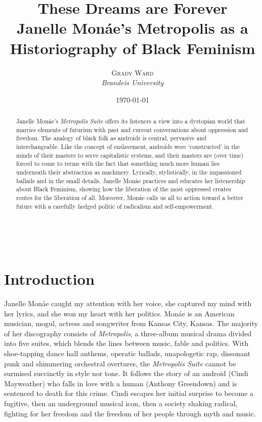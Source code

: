 \documentclass[a4paper, 11pt]{article} %
\title{\linespread{2.1}\textbf{These Dreams are Forever}\\ %
Janelle Mon\'ae's Metropolis as a Historiography of Black Feminism} %
\author{\textsc{Grady Ward} %
\\{\textit{Brandeis University}}} %
\date{\today} %
\makeatletter
\renewcommand{\maketitle}{ %
\begin{flushright} %
	{\LARGE\@title} %

	\vspace{40pt} %

	{\large\@author} %
	\\\@date %

	\vspace{30pt} %
\end{flushright}
}
\makeatother
\begin{document}
\maketitle %


\begin{abstract}

Janelle Mon\'ae's \emph{Metropolis Suite} offers its listeners a view into a dystopian world that marries elements of futurism with past and current conversations about oppression and freedom.
The analogy of black folk as androids is central, pervasive and interchangeable. 
Like the concept of enslavement, androids were `constructed' in the minds of their masters to serve capitalistic systems, and their masters are (over time) forced to come to terms with the fact that something much more human lies underneath their abstraction as machinery. 
Lyrically, stylistically, in the impassioned ballads and in the small details, Janelle Mon\'ae practices and educates her listenership about Black Feminism, showing how the liberation of the most oppressed creates routes for the liberation of all.
Moreover, Mon\'ae calls us all to action toward a better future with a carefully hedged politic of radicalism and self-empowerment.

\end{abstract}

\vspace{30pt}


\section*{Introduction}

Janelle Mon\'ae caught my attention with her voice, she captured my mind with her lyrics, and she won my heart with her politics.
Mon\'ae is an American musician, mogul, actress and songwriter from Kansas City, Kansas.
The majority of her discography consists of \emph{Metropolis}, a three-album musical drama divided into five suites, which blends the lines between music, fable and politics.
With shoe-tapping dance hall anthems, operatic ballads, unapologetic rap, dissonant punk and shimmering orchestral overtures, the \emph{Metropolis Suite} cannot be surmised succinctly in style nor tone.
It follows the story of an android (Cindi Mayweather) who falls in love with a human (Anthony Greendown) and is sentenced to death for this crime\cite{wolfmasters}.
Cindi escapes her initial surprise to become a fugitive\cite{manymoons}, then an underground musical icon\cite{favoritefugitive}, then a society shaking radical\cite{fiveseveneighttwoone}, fighting for her freedom and the freedom of her people through myth and music.
\end{document}
